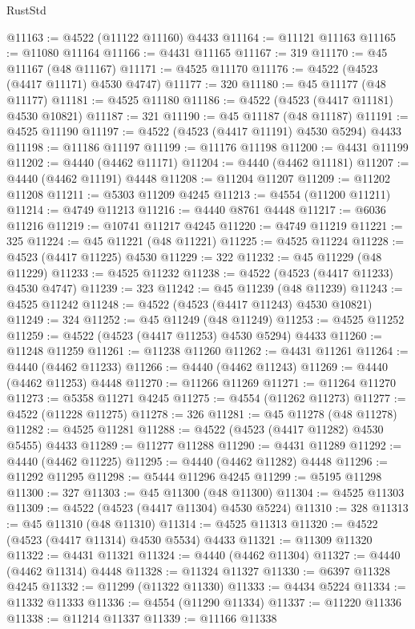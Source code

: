 \begin{lexlean}{RustStd}
\begin{coremodule}
{\begin{coremodule}
{{{{{{{{{{{{{{{{{{{{{{{{{{{{{{{{{{{{{{{{{{{{{{{{{{{{{{{{{{{{@11163 := @4522 (@11122 @11160) @4433
@11164 := @11121 @11163
@11165 := @11080 @11164
@11166 := @4431 @11165
@11167 := 319
@11170 := @45 @11167 (@48 @11167)
@11171 := @4525 @11170
@11176 := @4522 (@4523 (@4417 @11171) @4530 @4747)
@11177 := 320
@11180 := @45 @11177 (@48 @11177)
@11181 := @4525 @11180
@11186 := @4522 (@4523 (@4417 @11181) @4530 @10821)
@11187 := 321
@11190 := @45 @11187 (@48 @11187)
@11191 := @4525 @11190
@11197 := @4522 (@4523 (@4417 @11191) @4530 @5294) @4433
@11198 := @11186 @11197
@11199 := @11176 @11198
@11200 := @4431 @11199
@11202 := @4440 (@4462 @11171)
@11204 := @4440 (@4462 @11181)
@11207 := @4440 (@4462 @11191) @4448
@11208 := @11204 @11207
@11209 := @11202 @11208
@11211 := @5303 @11209 @4245
@11213 := @4554 (@11200 @11211)
@11214 := @4749 @11213
@11216 := @4440 @8761 @4448
@11217 := @6036 @11216
@11219 := @10741 @11217 @4245
@11220 := @4749 @11219
@11221 := 325
@11224 := @45 @11221 (@48 @11221)
@11225 := @4525 @11224
@11228 := @4523 (@4417 @11225) @4530
@11229 := 322
@11232 := @45 @11229 (@48 @11229)
@11233 := @4525 @11232
@11238 := @4522 (@4523 (@4417 @11233) @4530 @4747)
@11239 := 323
@11242 := @45 @11239 (@48 @11239)
@11243 := @4525 @11242
@11248 := @4522 (@4523 (@4417 @11243) @4530 @10821)
@11249 := 324
@11252 := @45 @11249 (@48 @11249)
@11253 := @4525 @11252
@11259 := @4522 (@4523 (@4417 @11253) @4530 @5294) @4433
@11260 := @11248 @11259
@11261 := @11238 @11260
@11262 := @4431 @11261
@11264 := @4440 (@4462 @11233)
@11266 := @4440 (@4462 @11243)
@11269 := @4440 (@4462 @11253) @4448
@11270 := @11266 @11269
@11271 := @11264 @11270
@11273 := @5358 @11271 @4245
@11275 := @4554 (@11262 @11273)
@11277 := @4522 (@11228 @11275)
@11278 := 326
@11281 := @45 @11278 (@48 @11278)
@11282 := @4525 @11281
@11288 := @4522 (@4523 (@4417 @11282) @4530 @5455) @4433
@11289 := @11277 @11288
@11290 := @4431 @11289
@11292 := @4440 (@4462 @11225)
@11295 := @4440 (@4462 @11282) @4448
@11296 := @11292 @11295
@11298 := @5444 @11296 @4245
@11299 := @5195 @11298
@11300 := 327
@11303 := @45 @11300 (@48 @11300)
@11304 := @4525 @11303
@11309 := @4522 (@4523 (@4417 @11304) @4530 @5224)
@11310 := 328
@11313 := @45 @11310 (@48 @11310)
@11314 := @4525 @11313
@11320 := @4522 (@4523 (@4417 @11314) @4530 @5534) @4433
@11321 := @11309 @11320
@11322 := @4431 @11321
@11324 := @4440 (@4462 @11304)
@11327 := @4440 (@4462 @11314) @4448
@11328 := @11324 @11327
@11330 := @6397 @11328 @4245
@11332 := @11299 (@11322 @11330)
@11333 := @4434 @5224
@11334 := @11332 @11333
@11336 := @4554 (@11290 @11334)
@11337 := @11220 @11336
@11338 := @11214 @11337
@11339 := @11166 @11338
}}}}}}}}}}}}}}}}}}}}}}}}}}}}}}}}}}}}}}}}}}}}}}}}}}}}}}}}}}}}
\end{coremodule}}
\end{coremodule}
\end{lexlean}
